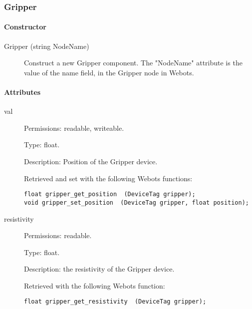 \subsubsection{Gripper}
\label{webots.uobjects.robotdevices.gripper}%

\paragraph{Constructor}
\label{webots.uobjects.robotdevices.gripper.constructor}%

\noindent
\begin{description}
\item[{Gripper (string NodeName)}] Construct a new Gripper component. The "NodeName" attribute is the value
          of the name field, in the Gripper node in Webots.

\end{description}

\paragraph{Attributes}
\label{webots.uobjects.robotdevices.gripper.attributes}%

\noindent
\begin{description}
\item[{         val
 }]            Permissions: readable, writeable.


 Type: float.


 Description: Position of the Gripper device.


 Retrieved and set with the following Webots functions:


\begin{lstlisting}
float gripper_get_position  (DeviceTag gripper);
void gripper_set_position  (DeviceTag gripper, float position);
\end{lstlisting}
\item[{         resistivity
 }]            Permissions: readable.


 Type: float.


 Description: the resistivity of the Gripper device.


 Retrieved with the following Webots function:


\begin{lstlisting}
float gripper_get_resistivity  (DeviceTag gripper);
\end{lstlisting}
\end{description}

